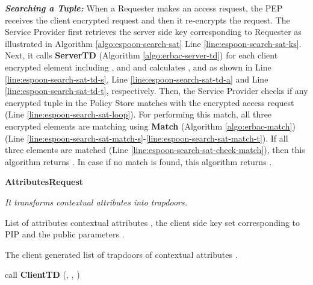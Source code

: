 \documentclass[epsfig,a4paper,11pt,titlepage]{book}
\numberwithin{algorithm}{chapter}
\newcommand{\algofontsize}{\fontsize{11}{12}\selectfont}
\begin{document}
\noindent \emph{\textbf{Searching a Tuple:}}
When a Requester makes an access request, the \gls{PEP} receives the client encrypted request and then it re-encrypts the request. The Service Provider first retrieves the server side key corresponding to Requester  as illustrated in Algorithm \ref{algo:espoon-search-sat} Line \ref{line:espoon-search-sat-ks}. Next, it calls \textbf{ServerTD} (Algorithm \ref{algo:erbac-server-td}) for each client encrypted element including ,  and  and calculates ,  and  as shown in Line \ref{line:espoon-search-sat-td-s}, Line \ref{line:espoon-search-sat-td-a} and Line \ref{line:espoon-search-sat-td-t}, respectively. Then, the Service Provider checks if any encrypted tuple in the Policy Store matches with the encrypted access request (Line \ref{line:espoon-search-sat-loop}). For performing this match, all three encrypted elements are matching using \textbf{Match} (Algorithm \ref{algo:erbac-match}) (Line \ref{line:espoon-search-sat-match-s}-\ref{line:espoon-search-sat-match-t}). If all three elements are matched (Line \ref{line:espoon-search-sat-check-match}), then this algorithm returns . In case if no match is found, this algorithm returns .



\begin{algorithm} [htp]
{\algofontsize
\caption{\textbf{AttributesRequest}}

\label{algo:erbac-request-contextual-condition}

\begin{algorithmic}[1]

\INPUT \emph{It transforms contextual attributes into trapdoors.}

\Require List of attributes contextual attributes , the client side key set  corresponding to \gls{PIP}  and the public parameters .

\Ensure The client generated list of trapdoors of contextual attributes .

\medskip

\State  \label{request-cc-init}

 \label{request-cc-loop}

	\State  call \textbf{ClientTD} (, , ) \label{request-cc-td}
	
	\State  \label{request-cc-update}

\EndFor

\Return 

\end{algorithmic}
}
\end{algorithm}
\end{document}
